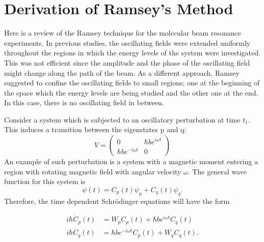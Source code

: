 \chapter{Derivation of Ramsey's Method~\cite{NMR_Notes}}
Here is a review of the Ramsey technique for the molecular beam
resonance experiments. In previous studies, the oscillating fields
were extended uniformly throughout the regions in which the energy
levels of the system were investigated.  This was not efficient since
the amplitude and the phase of the oscillating field might change
along the path of the beam. As a different approach, Ramsey suggested
to confine the oscillating fields to small regions; one at the
beginning of the space which the energy levels are being studied and
the other one at the end. In this case, there is no oscillating field
in between.

Consider a system which is subjected to an oscillatory perturbation at
time $t_1$. This induces a transition between the eigenstates p and q:
\begin{equation}
V=
\left(
\begin{array}{cc}
0 & \hbar b e^{i\omega t} \\ 
\hbar b e^{-i \omega t} & 0
\end{array} 
\right)
\end{equation}
An example of such perturbation is a system with a magnetic moment
entering a region with rotating magnetic field with angular velocity
$\omega$. The general wave function for this system is
\begin{equation}
\psi(t)= C_p (t) \psi_p + C_q(t) \psi_q.
\end{equation}
Therefore, the time dependent Schr\"{o}dinger equations will have the
form

\begin{align}
 \label{eqn:cp}
  i \hbar \dot{C}_p(t)&= W_p C_p(t)+\hbar b e^{i \omega t} C_q(t) \\
   \label{eqn:cq}
i \hbar \dot{C}_q(t)&=\hbar b e^{-i \omega t} C_p(t) +W_q C_q(t).
\end{align}

